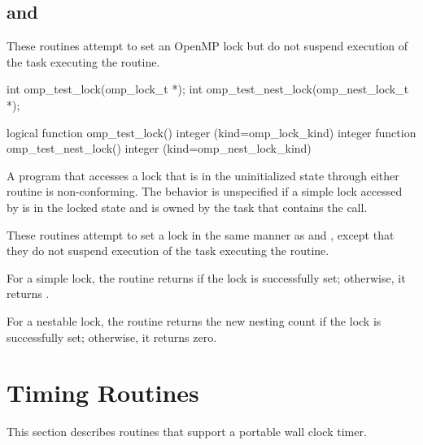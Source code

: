 \subsection{ and }
\label{subsec:omp_test_lock and omp_test_nest_lock}
\summary
These routines attempt to set an OpenMP lock but do not suspend execution of the task 
executing the routine.

\format
\ccppspecificstart
\begin{boxedcode}
int omp\_test\_lock(omp\_lock\_t *);
int omp\_test\_nest\_lock(omp\_nest\_lock\_t *);
\end{boxedcode}
\ccppspecificend

\fortranspecificstart
\begin{boxedcode}
logical function omp\_test\_lock()
integer (kind=omp\_lock\_kind) 
integer function omp\_test\_nest\_lock()
integer (kind=omp\_nest\_lock\_kind) 
\end{boxedcode}
\fortranspecificend

\constraints
A program that accesses a lock that is in the uninitialized state through either routine is 
non-conforming. The behavior is unspecified if a simple lock accessed by 
 is in the locked state and is owned by the task that contains the call.

\effect 
These routines attempt to set a lock in the same manner as  and 
, except that they do not suspend execution of the task 
executing the routine.

For a simple lock, the  routine returns  if the lock is successfully 
set; otherwise, it returns .

For a nestable lock, the  routine returns the new nesting count 
if the lock is successfully set; otherwise, it returns zero.







\section{Timing Routines}
\label{sec:Timing Routines}
This section describes routines that support a portable wall clock timer.










